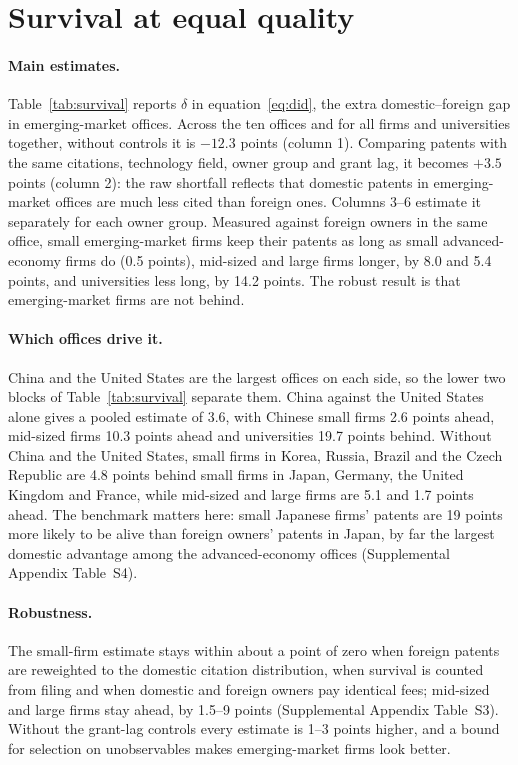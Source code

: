 \section{Survival at equal quality}\label{sec:survival}

\paragraph{Main estimates.} Table~\ref{tab:survival} reports $\delta$ in equation~\eqref{eq:did}, the extra
domestic--foreign gap in emerging-market offices. Across the ten offices and for all firms and universities together,
without controls it is $-12.3$ points (column 1). Comparing patents with the same citations, technology field, owner
group and grant lag, it becomes $+3.5$ points (column 2): the raw shortfall reflects that domestic patents in emerging-market
offices are much less cited than foreign ones. Columns 3--6 estimate it separately for each owner group. Measured
against foreign owners in the same office, small emerging-market firms keep their patents as long as small
advanced-economy firms do (0.5 points), mid-sized and large firms longer, by 8.0 and 5.4 points, and universities
less long, by 14.2 points.
The robust result is that emerging-market firms are not behind.



\paragraph{Which offices drive it.} China and the United States are the largest offices on each side, so the lower
two blocks of Table~\ref{tab:survival} separate them. China against the United States alone gives a pooled estimate of
3.6, with Chinese small firms 2.6 points ahead, mid-sized firms 10.3 points ahead and universities 19.7 points behind.
Without China and the United States, small firms in Korea, Russia, Brazil and the Czech Republic are 4.8 points behind
small firms in Japan, Germany, the United Kingdom and France, while mid-sized and large firms are 5.1 and 1.7 points
ahead. The benchmark matters here: small Japanese firms' patents are 19 points more likely to be alive than foreign
owners' patents in Japan, by far the largest domestic advantage among the advanced-economy offices (Supplemental
Appendix Table~S4).

\paragraph{Robustness.} The small-firm estimate stays within about a point of zero when foreign patents are reweighted
to the domestic citation distribution, when survival is counted from filing and when domestic and foreign owners pay
identical fees; mid-sized and large firms stay ahead, by 1.5--9 points (Supplemental Appendix Table~S3). Without the
grant-lag controls every estimate is 1--3 points higher, and a bound for selection on unobservables makes
emerging-market firms look better.

